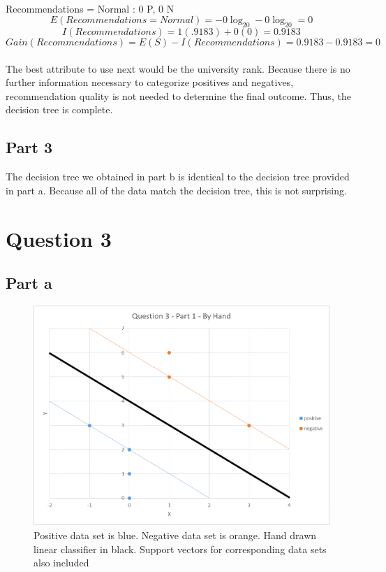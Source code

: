 \documentclass[12pt]{article}
\begin{document}
\\
Recommendations = Normal : 0 P, 0 N
\begin{equation}
E(Recommendations = Normal) = -0\log_20-0\log_20 = 0
\end{equation}
\begin{equation}
I(Recommendations) = 1(.9183)+0(0) = 0.9183
\end{equation}
\begin{equation}
Gain(Recommendations) = E(S) - I(Recommendations) = 0.9183 - 0.9183 = 0
\end{equation}
\\
The best attribute to use next would be the university rank. Because there is no further information necessary to categorize positives and negatives, recommendation quality is not needed to determine the final outcome. Thus, the decision tree is complete.

\subsection*{Part 3}

The decision tree we obtained in part b is identical to the decision tree provided in part a. Because all of the data match the decision tree, this is not surprising.

\section*{Question 3}
\subsection*{Part a}
\begin{figure}[H]
    \centering
    \includegraphics[width=1\textwidth]{question_3_plot_1}
    \caption{Positive data set is blue. Negative data set is orange. Hand drawn linear classifier in black. Support vectors for corresponding data sets also included}
    \label{fig:question_3_plot_1}
\end{figure}
\end{document}
